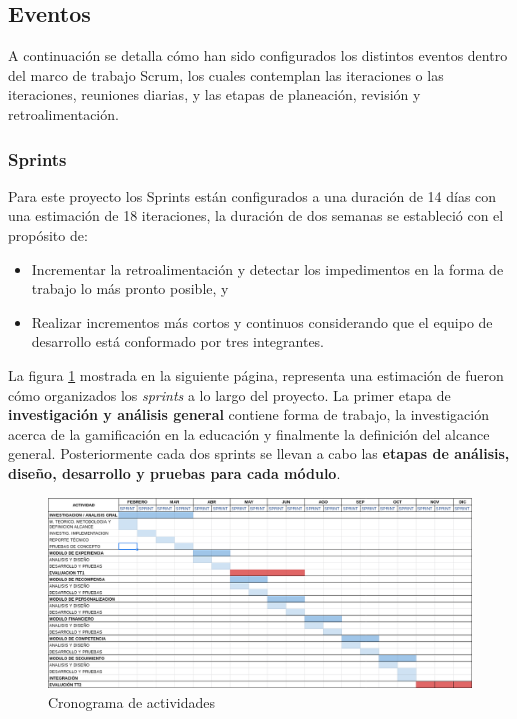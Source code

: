 \subsection{Eventos}

 A continuación se detalla cómo han sido configurados los distintos eventos dentro
 del marco de trabajo Scrum, los cuales contemplan las iteraciones o las iteraciones,
 reuniones diarias, y las etapas de planeación, revisión y retroalimentación.

\subsubsection{Sprints}

 \noindent Para este proyecto los Sprints están configurados a una duración de 14
 días con una estimación de 18 iteraciones, la duración de dos semanas se estableció
 con el propósito de:

    \begin{itemize}
    \item Incrementar la retroalimentación y detectar los impedimentos
          en la forma de trabajo lo más pronto posible, y

    \item Realizar incrementos más cortos y continuos considerando que el
          equipo de desarrollo está conformado por tres integrantes.
    \end{itemize}

 \noindent
 La figura \ref{fig:cronograma}  mostrada en la siguiente página, representa una
 estimación de fueron cómo organizados los {\it sprints} a lo largo del proyecto. La
 primer etapa de {\bf investigación y análisis general} contiene forma de trabajo, la
 investigación acerca de la gamificación en la educación y finalmente la definición
 del alcance general. Posteriormente cada dos sprints se llevan a cabo las {\bf
 etapas de análisis, diseño, desarrollo y pruebas para cada módulo}. \clearpage

    \begin{figure}
        \centering
        \includegraphics[width=1\textwidth]{analisis/diagrams/cronograma}
        \caption{Cronograma de actividades}
        \label{fig:cronograma}
    \end{figure}

